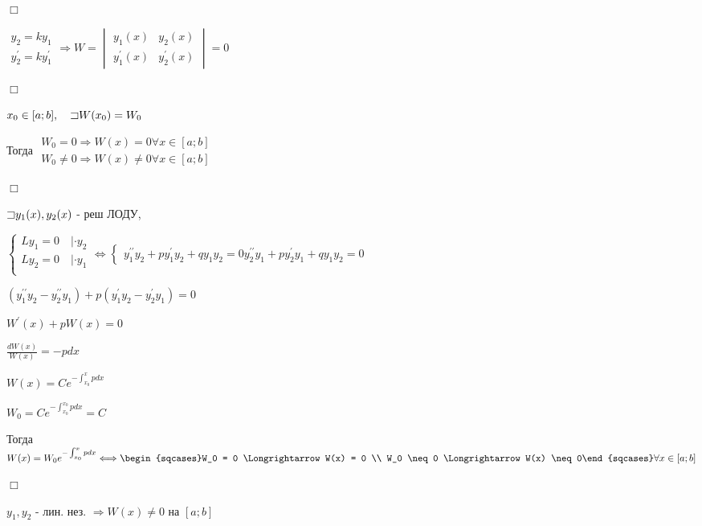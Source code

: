 \documentclass[12pt]{article}
\begin{document}
    $\Box$

    $\begin{matrix}y_2 = k y_1 \\ y_2^\prime = k y_1^\prime\end{matrix} \Longrightarrow W = \begin{vmatrix}y_1(x) & y_2(x) \\ y_1^\prime(x) & y_2^\prime(x)\end{vmatrix} = 0$

    $\Box$

     $x_0 \in [a;b], \quad \mathord{\sqsupset} W(x_0) = W_0$

    Тогда $\begin{matrix}W_0 = 0 \Longrightarrow W(x) = 0 \forall x \in [a;b] \\
    W_0 \neq 0 \Longrightarrow W(x) \neq 0 \forall x \in [a;b]\end{matrix}$

    $\Box$

    $\mathord{\sqsupset} y_1(x), y_2(x)$ - реш ЛОДУ,

    $\begin{cases}
        Ly_1 = 0 \quad | \cdot y_2 \\
        Ly_2 = 0 \quad | \cdot y_1 \\
    \end{cases} \Longleftrightarrow
    \begin{cases}
        y_1^{\prime\prime} y_2 + py_1^{\prime} y_2 + q y_1 y_2 = 0
        y_2^{\prime\prime} y_1 + py_2^{\prime} y_1 + q y_1 y_2 = 0
    \end{cases}$

    $(y_1^{\prime\prime} y_2 - y_2^{\prime\prime} y_1) + p (y_1^{\prime} y_2 - y_2^{\prime} y_1) = 0$

    $W^\prime(x) + pW(x) = 0$

    $\frac{dW(x)}{W(x)} = -pdx$

    $W(x) = Ce^{-\int_{x_0}^x pdx}$

    $W_0 = Ce^{-\int^{x_0}_{x_0} pdx} = C$

    Тогда $W(x) = W_0 e^{-\int_{x_0}^x pdx} \Longleftrightarrow \begin{sqcases}W_0 = 0 \Longrightarrow W(x) = 0 \\ W_0 \neq 0 \Longrightarrow W(x) \neq 0\end{sqcases} \forall x \in [a;b]$

    $\Box$

     $y_1, y_2$ - лин. нез. $\Longrightarrow W(x) \neq 0$ на $[a;b]$
\end{document}
